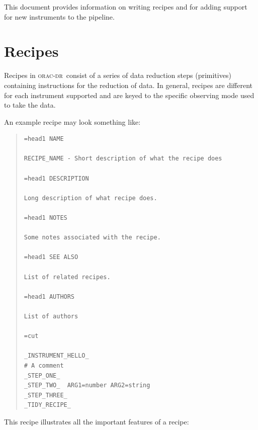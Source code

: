 \documentclass[twoside,11pt]{article}
\renewcommand{\_}{\texttt{\symbol{95}}}
\newcommand{\Oracdr}{\textsc{orac-dr}}
\newenvironment{myquote}{\begin{quote}\begin{small}}{\end{small}\end{quote}}
\begin{document}
This document provides information on writing recipes and for adding
support for new instruments to the pipeline.


\section{Recipes}

Recipes in \Oracdr\ consist of a series of data reduction steps
(primitives) containing instructions for the reduction of
data. In general, recipes are different for each instrument supported
and are keyed to the specific observing mode used to take the data.

An example recipe may look something like:

\begin{myquote}
\begin{verbatim}
=head1 NAME

RECIPE_NAME - Short description of what the recipe does

=head1 DESCRIPTION

Long description of what recipe does.

=head1 NOTES

Some notes associated with the recipe.

=head1 SEE ALSO

List of related recipes.

=head1 AUTHORS

List of authors

=cut

_INSTRUMENT_HELLO_
# A comment
_STEP_ONE_
_STEP_TWO_  ARG1=number ARG2=string
_STEP_THREE_
_TIDY_RECIPE_
\end{verbatim}
\end{myquote}

This recipe illustrates all the important features of a recipe:
\end{document}
